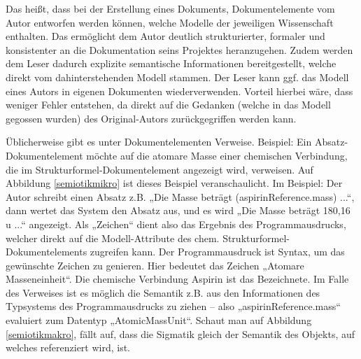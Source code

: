 
Das heißt, dass bei der Erstellung eines Dokuments, Dokumentelemente vom Autor entworfen werden können, welche Modelle der jeweiligen Wissenschaft enthalten. Das ermöglicht dem Autor deutlich strukturierter, formaler und konsistenter an die Dokumentation seins Projektes heranzugehen. Zudem werden dem Leser dadurch explizite semantische Informationen bereitgestellt, welche direkt vom dahinterstehenden Modell stammen. Der Leser kann ggf. das Modell eines Autors in eigenen Dokumenten wiederverwenden. Vorteil hierbei wäre, dass weniger Fehler entstehen, da direkt auf die Gedanken (welche in das Modell gegossen wurden) des Original-Autors zurückgegriffen werden kann.

 
Üblicherweise gibt es unter Dokumentelementen Verweise. Beispiel: Ein Absatz-Dokumentelement möchte auf die atomare Masse einer chemischen Verbindung, die im Strukturformel-Dokumentelement angezeigt wird, verweisen. Auf Abbildung \ref{semiotikmikro} ist dieses Beispiel veranschaulicht. Im Beispiel: Der Autor schreibt einen Absatz z.B. „Die Masse beträgt (aspirinReference.mass) ...“, dann wertet das System den Absatz aus, und es wird „Die Masse beträgt 180,16 u ...“ angezeigt. Als „Zeichen“ dient also das Ergebnis des Programmausdrucks, welcher direkt auf die Modell-Attribute des chem. Strukturformel-Dokumentelements zugreifen kann. Der Programmausdruck ist Syntax, um das gewünschte Zeichen zu genieren. Hier bedeutet das Zeichen „Atomare Masseneinheit“. Die chemische Verbindung Aspirin ist das Bezeichnete. Im Falle des Verweises ist es möglich die Semantik z.B. aus den Informationen des Typsystems des Programmausdrucks zu ziehen -- also „aspirinReference.mass“ evaluiert zum Datentyp „AtomicMassUnit“. Schaut man auf Abbildung \ref{semiotikmakro}, fällt auf, dass die Sigmatik gleich der Semantik des Objekts, auf welches referenziert wird, ist.


